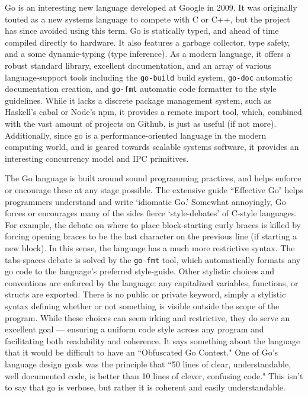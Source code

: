 \documentclass[12pt, letterpaper]{article}
\begin{document}

Go is an interesting new language developed at Google in 2009. It was 
originally touted as a new systems language to compete with C or C++, 
but the project has since avoided using this term. Go is statically 
typed, and ahead of time compiled directly to hardware. It also 
features a garbage collector, type safety, and a some dynamic-typing 
(type inference). As a modern language, it offers a robust standard 
library, excellent documentation, and an array of various 
language-support tools including the \verb+go-build+ build system, 
\verb+go-doc+ automatic documentation creation, and \verb+go-fmt+ 
automatic code formatter to the style guidelines. While it lacks a 
discrete package management system, such as Haskell's cabal or Node's 
npm, it provides a remote import tool, which, combined with the vast 
amount of projects on Github, is just as useful (if not more). 
Additionally, since go is a performance-oriented language in the modern 
computing world, and is geared towards scalable systems software, it 
provides an interesting concurrency model and IPC primitives.

The Go language is built around sound programming practices, and helps 
enforce or encourage these at any stage possible. The extensive guide 
``Effective Go" helps programmers understand and write `idiomatic Go.' 
Somewhat annoyingly, Go forces or encourages many of the sides fierce 
`style-debates' of C-style languages. For example, the debate on where 
to place block-starting curly braces is killed by forcing opening 
braces to be the last character on the previous line (if starting a new 
block). In this sense, the language has a much more restrictive syntax. 
The tabs-spaces debate is solved by the \verb+go-fmt+ tool, which 
automatically formats any go code to the language's preferred 
style-guide. Other stylistic choices and conventions are enforced by 
the language: any capitalized variables, functions, or structs are 
exported. There is no public or private keyword, simply a stylistic 
syntax defining whether or not something is visible outside the scope 
of the program. While these choices can seem irking and restrictive, 
they do serve an excellent goal --- ensuring a uniform code style 
across any program and facilitating both readability and coherence. It 
says something about the language that it would be difficult to have an 
``Obfuscated Go Contest." One of Go's language design goals was the 
principle that ``50 lines of clear, understandable, well documented 
code, is better than 10 lines of clever, confusing code." This isn't to 
say that go is verbose, but rather it is coherent and easily
understandable.
\end{document}
